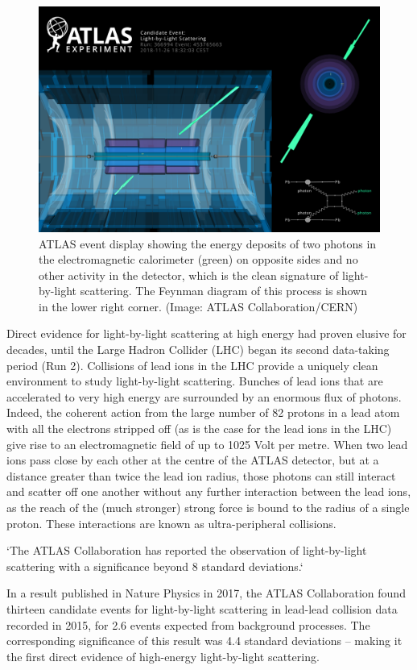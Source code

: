 \documentclass{article}
\begin{document}
\begin{figure}[ht]
	\centering
	\includegraphics[width=0.5\linewidth]{figures/EventDisplay_LbyL.png}
	\caption{ATLAS event display showing the energy deposits of two photons in the electromagnetic
		calorimeter (green) on opposite sides and no other activity in the detector, which is the clean signature
		of light-by-light scattering. The Feynman diagram of this process is shown in the lower right corner.
		(Image: ATLAS Collaboration/CERN)}
	\label{fig:Atlas_event}
\end{figure}
Direct evidence for light-by-light scattering at high energy had proven elusive for decades, until the Large Hadron
Collider (LHC) began its second data-taking period (Run 2). Collisions of lead ions in the LHC
provide a uniquely clean environment to study light-by-light scattering. Bunches of lead ions that are accelerated to
very high energy are surrounded by an enormous flux of photons. Indeed, the coherent action from the large number of
82 protons in a lead atom with all the electrons stripped off (as is the case for the lead ions in the LHC)
give rise to an electromagnetic field of up to 1025 Volt per metre. When two lead ions pass close by each
other at the centre of the ATLAS detector, but at a distance greater than twice the lead ion radius, those
photons can still interact and scatter off one another without any further interaction between the lead ions, as the reach of
the (much stronger) strong force is bound to the radius of a single proton. These interactions are
known as ultra-peripheral collisions.

`The ATLAS Collaboration has reported the observation of light-by-light scattering with a significance
beyond 8 standard deviations.`


In a result published in Nature Physics in 2017, the ATLAS Collaboration found thirteen candidate events for light-by-light scattering in lead-lead collision data recorded in 2015, for 2.6 events expected from background processes. The corresponding significance of this result was 4.4 standard deviations – making it the first direct evidence of high-energy light-by-light scattering.
\end{document}
